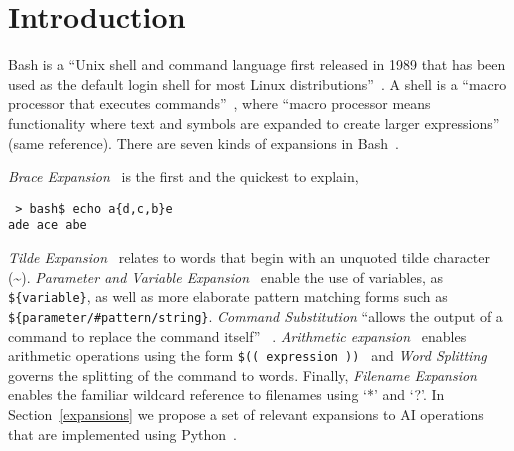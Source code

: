 \section{Introduction}
\label{intro}

Bash is a \enquote{Unix shell and command language first released in 1989 that has been used as the default login shell for most Linux distributions}~. A shell is a \enquote{macro processor that executes commands}~, where \enquote{macro processor means functionality where text and symbols are expanded to create larger expressions} (same reference). There are seven kinds of expansions in Bash~.

\emph{Brace Expansion}~ is the first and the quickest to explain,
%
\begin{verbatim}
 > bash$ echo a{d,c,b}e
ade ace abe
\end{verbatim}
%
\emph{Tilde Expansion}~ relates to words that begin with an unquoted tilde character (\textasciitilde). \emph{Parameter and Variable Expansion}~ enable the use of variables, as \texttt{\$\{variable\}}, as well as more elaborate pattern matching forms such as \texttt{\$\{parameter/\#pattern/string\}}. \emph{Command Substitution} \enquote{allows the output of a command to replace the command itself} ~. \emph{Arithmetic expansion}~ enables arithmetic operations using the form \texttt{\$(( expression ))
} and \emph{Word Splitting} governs the splitting of the command to words. Finally, \emph{Filename Expansion}~ enables the familiar wildcard reference to filenames using `*' and `?'. In Section~\ref{expansions} we propose a set of relevant expansions to AI operations that are implemented using Python~.

